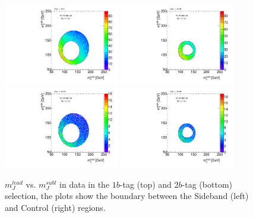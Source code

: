 \begin{figure}[htbp!]
\begin{center}
  \includegraphics[width=0.45\textwidth,angle=-90]{figures/boosted/Other/Sideband_OneTag_mH0H1.pdf}
  \includegraphics[width=0.45\textwidth,angle=-90]{figures/boosted/Other/Control_OneTag_mH0H1.pdf}\\
  \includegraphics[width=0.45\textwidth,angle=-90]{figures/boosted/Other/Sideband_TwoTag_mH0H1.pdf}
  \includegraphics[width=0.45\textwidth,angle=-90]{figures/boosted/Other/Control_TwoTag_mH0H1.pdf}
  \caption{$m_J^{lead}$ vs. $m_J^{subl}$ in data in the $1b$-tag (top) and $2b$-tag (bottom) selection, the plots show the boundary between the Sideband (left) and Control (right) regions.}
  \label{fig:boosted-region-def}
\end{center}
\end{figure}

